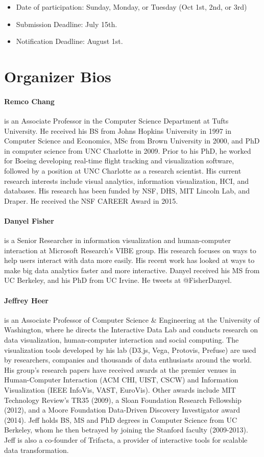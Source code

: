 \documentclass[journal]{vgtc}                %
\begin{document}
\begin{itemize}
  \item Date of participation: Sunday, Monday, or Tuesday (Oct 1st,
    2nd, or 3rd)
  \item Submission Deadline: July 15th.
  \item Notification Deadline: August 1st.
\end{itemize}

\section{Organizer Bios}

\paragraph*{Remco Chang} is an Associate Professor in the Computer Science Department at Tufts University. He received his BS from Johns Hopkins University in 1997 in Computer Science and Economics, MSc from Brown University in 2000, and PhD in computer science from UNC Charlotte in 2009. Prior to his PhD, he worked for Boeing developing real-time flight tracking and visualization software, followed by a position at UNC Charlotte as a research scientist. His current research interests include visual analytics, information visualization, HCI, and databases. His research has been funded by NSF, DHS, MIT Lincoln Lab, and Draper. He received the NSF CAREER Award in 2015.

\paragraph*{Danyel Fisher} is a Senior Researcher in information visualization and human-computer interaction at Microsoft Research's VIBE group. His research focuses on ways to help users interact with data more easily. His recent work has looked at ways to make big data analytics faster and more interactive. Danyel received his MS from UC Berkeley, and his PhD from UC Irvine. He tweets at @FisherDanyel.

\paragraph*{Jeffrey Heer} is an Associate Professor of Computer Science \& Engineering at the University of Washington, where he directs the Interactive Data Lab and conducts research on data visualization, human-computer interaction and social computing. The visualization tools developed by his lab (D3.js, Vega, Protovis, Prefuse) are used by researchers, companies and thousands of data enthusiasts around the world. His group's research papers have received awards at the premier venues in Human-Computer Interaction (ACM CHI, UIST, CSCW) and Information Visualization (IEEE InfoVis, VAST, EuroVis). Other awards include MIT Technology Review's TR35 (2009), a Sloan Foundation Research Fellowship (2012), and a Moore Foundation Data-Driven Discovery Investigator award (2014). Jeff holds BS, MS and PhD degrees in Computer Science from UC Berkeley, whom he then betrayed by joining the Stanford faculty (2009-2013). Jeff is also a co-founder of Trifacta, a provider of interactive tools for scalable data transformation.
\end{document}
